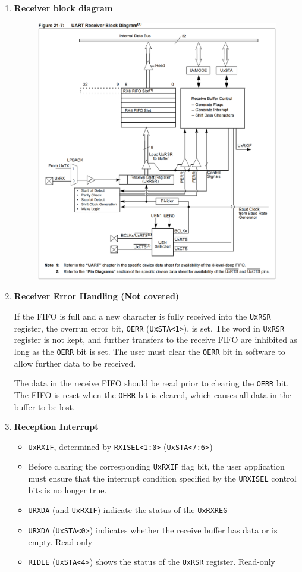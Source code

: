 \documentclass[a4paper]{article}
\begin{document}
\begin{enumerate}[label = \arabic*.]
    \item \textbf{Receiver block diagram}
      \begin{figure}[H]
        \centering
        \includegraphics[width=0.8\linewidth]{UART_receiver_block_diagram.png}
        \label{fig:UART_receiver_block_diagram.png}
      \end{figure}

    \item \textbf{Receiver Error Handling (Not covered)}
      \par If the FIFO is full and a new character is fully received into the \verb|UxRSR| register, the overrun error bit, \verb|OERR| (\verb|UxSTA<1>|), is set. The word in \verb|UxRSR| register is not kept, and further transfers to the receive FIFO are inhibited as long as the \verb|OERR| bit is set. The user must clear the \verb|OERR| bit in software to allow further data to be received.

      \par The data in the receive FIFO should be read prior to clearing the \verb|OERR| bit. The FIFO is reset when the \verb|OERR| bit is cleared, which causes all data in the buffer to be lost.
    \item \textbf{Reception Interrupt}
      \begin{itemize}[leftmargin = 0.5cm]
        \item \verb|UxRXIF|, determined by \verb|RXISEL<1:0>| (\verb|UxSTA<7:6>|)
        \item Before clearing the corresponding \verb|UxRXIF| flag bit, the user application must ensure that the interrupt condition specified by the \verb|URXISEL| control bits is no longer true.
        \item \verb|URXDA| (and \verb|UxRXIF|) indicate the status of the \verb|UxRXREG|
        \item \verb|URXDA| (\verb|UxSTA<0>|) indicates whether the receive buffer has data or is empty. Read-only
        \item \verb|RIDLE| (\verb|UxSTA<4>|) shows the status of the \verb|UxRSR| register. Read-only
      \end{itemize}


\end{enumerate}
\end{document}
